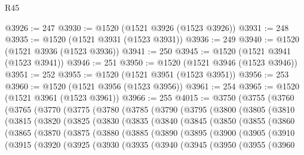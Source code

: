 \begin{lexlean}{R45}
\begin{coremodule}
{@3926 := 247
@3930 := @1520 (@1521 @3926 (@1523 @3926))
@3931 := 248
@3935 := @1520 (@1521 @3931 (@1523 @3931))
@3936 := 249
@3940 := @1520 (@1521 @3936 (@1523 @3936))
@3941 := 250
@3945 := @1520 (@1521 @3941 (@1523 @3941))
@3946 := 251
@3950 := @1520 (@1521 @3946 (@1523 @3946))
@3951 := 252
@3955 := @1520 (@1521 @3951 (@1523 @3951))
@3956 := 253
@3960 := @1520 (@1521 @3956 (@1523 @3956))
@3961 := 254
@3965 := @1520 (@1521 @3961 (@1523 @3961))
@3966 := 255
@4015 := @3750
    (@3755
      (@3760
        (@3765
          (@3770
            (@3775
              (@3780
                (@3785
                  (@3790
                    (@3795
                      (@3800
                        (@3805
                          (@3810
                            (@3815
                              (@3820
                                (@3825
                                  (@3830
                                    (@3835
                                      (@3840
                                        (@3845
                                          (@3850
                                            (@3855
                                              (@3860
                                                (@3865
                                                  (@3870
                                                    (@3875
                                                      (@3880
                                                        (@3885
                                                          (@3890
                                                            (@3895
                                                              (@3900
                                                                (@3905
                                                                  (@3910
                                                                    (@3915
                                                                      (@3920
                                                                        (@3925
                                                                          (@3930
                                                                            (@3935
                                                                              (@3940
                                                                                (@3945
                                                                                  (@3950
                                                                                    (@3955
                                                                                      (@3960
}
\end{coremodule}
\end{lexlean}
